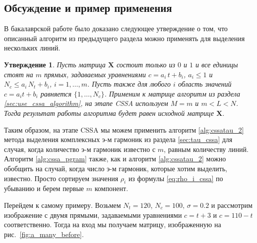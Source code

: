 \documentclass[specialist,
               substylefile = spbu.rtx,
               subf,href,colorlinks=true, 12pt]{disser}
\newtheorem{Th}{Утверждение}
\begin{document}
\subsection{Обсуждение и пример применения}
В бакалаврской работе \cite{Zhornikova2016} было доказано следующее утверждение о том, что описанный алгоритм из предыдущего раздела можно применять для выделения нескольких линий.

\begin{Th} \cite[Утверждение 20]{Zhornikova2016}
Пусть матрица $\mathbf{X}$ состоит только из $0$ и $1$ и все единицы стоят на $m$ прямых, задаваемых уравнениями $c = a_i\,t + b_i$,  $a_i \leqslant 1$ и $N_c \leqslant a_i\,N_t + b_i$, $i=1,\ldots,m$. Пусть также для любого $i$
область значений $c = a_i t + b_i$ равняется $\{1,\ldots,N_c\}$.
Применим к матрице алгоритм из раздела \ref{sec:use_cssa_algorithm}, на этапе CSSA используем $M = m$ и $m<L<N$. Тогда результат работы алгоритма будет равен исходной матрице $\mathbf{X}$.
\end{Th}

Таким образом, на этапе CSSA мы можем применить алгоритм \ref{alg:cssatau_2} метода выделения комплексных э-м гармоник из раздела \ref{sec:tau_cssa} для случая, когда количество э-м гармоник известно с $m$, равным количеству линий. Алгоритм \ref{alg:cssa_pgram} также, как и алгоритм \ref{alg:cssatau_2} можно обобщить на случай, когда число э-м гармоник, которые хотим выделить, известно. Просто сортируем значения $\rho_i$ из формулы \eqref{eq:rho_i_cssa} по убыванию и берем первые $m$ компонент. 

Перейдем к самому примеру.
Возьмем $N_t = 120$, $N_c = 100$, $\sigma = 0.2$ и рассмотрим изображение с двумя прямыми, задаваемыми уравнениями $c = t + 3$ и $c = 110 - t$ соответственно. Тогда на вход мы получаем матрицу, изображенную на рис.~\ref{fig:a_many_before}.
\end{document}
